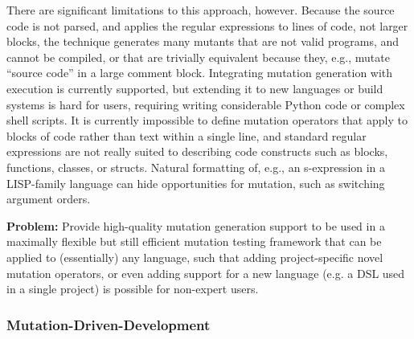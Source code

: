 There are significant limitations to this approach, however.  Because the source code is not parsed, and applies the regular expressions to lines of code, not larger blocks, the technique generates many mutants that are not valid programs, and cannot be compiled, or that are trivially equivalent because they, e.g., mutate ``source code'' in a large comment block.  Integrating mutation generation with execution is currently supported, but extending it to new languages or build systems is hard for users, requiring writing considerable Python code or complex shell scripts.  It is currently impossible to define mutation operators that apply to blocks of code rather than text within a single line, and standard regular expressions are not really suited to describing code constructs such as blocks, functions, classes, or structs.  Natural formatting of, e.g., an s-expression in a LISP-family language can hide opportunities for mutation, such as switching argument orders.

\begin{framed}
{\bf Problem:}  Provide high-quality mutation generation support to be used in a maximally flexible but still efficient mutation testing framework that can be applied to (essentially) any language, such that adding project-specific novel mutation operators, or even adding support for a new language (e.g. a DSL used in a single project) is possible for non-expert users.
\end{framed}

\subsubsection{Mutation-Driven-Development}

